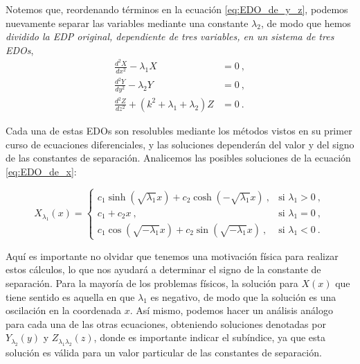 Notemos que, reordenando términos en la ecuación \eqref{eq:EDO_de_y_z}, podemos nuevamente separar las variables mediante una constante $\lambda_2$, de modo que hemos \emph{dividido la EDP original, dependiente de tres variables, en un sistema de tres EDOs},
\begin{align}
    \frac{d^2X}{dx^2} - \lambda_1 X & = 0 \ , \label{eq:EDO_de_x}  \\
    \frac{d^2Y}{dy^2} - \lambda_2 Y & = 0 \ , \label{eq:EDO_de_y}  \\
    \frac{d^2Z}{dz^2} + (k^2 + \lambda_1 + \lambda_2) Z & = 0 \ . \label{eq:EDO_de_z} 
\end{align}

Cada una de estas EDOs son resolubles mediante los métodos vistos en su primer curso de ecuaciones diferenciales, y las soluciones dependerán del valor y del signo de las constantes de separación. Analicemos las posibles soluciones de la ecuación \eqref{eq:EDO_de_x}:

\begin{equation}
    X_{\lambda_1}(x) = \left\{
    \begin{array}{cc} 
            c_1 \sinh(\sqrt{\lambda_1} x) + c_2 \cosh(-\sqrt{\lambda_1}x) \ , & \text{si } \lambda_1 > 0 \ , \\
            c_1 + c_2 x \ , & \text{si } \lambda_1 = 0 \ , \\
            c_1 \cos(\sqrt{-\lambda_1}x) + c_2 \sin(\sqrt{-\lambda_1}x) \ , & \text{si } \lambda_1 < 0 \ .
    \end{array}
    \right.
\end{equation}

Aquí es importante no olvidar que tenemos una motivación física para realizar estos cálculos, lo que nos ayudará a determinar el signo de la constante de separación. Para la mayoría de los problemas físicos, la solución para $X(x)$ que tiene sentido es aquella en que $\lambda_1$ es negativo, de modo que la solución es una oscilación en la coordenada $x$. Así mismo, podemos hacer un análisis análogo para cada una de las otras ecuaciones, obteniendo soluciones denotadas por $Y_{\lambda_2}(y)$ y $Z_{\lambda_1 \lambda_2}(z)$, donde es importante indicar el subíndice, ya que esta solución es válida para un valor particular de las constantes de separación.

